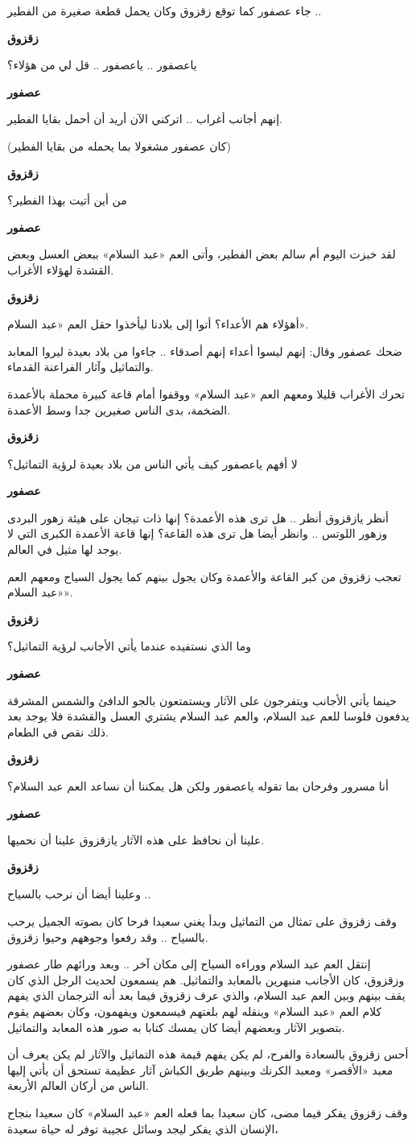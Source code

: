 \documentclass[12pt]{article}
\newlength{\SpeakerGutter}
\newlength{\DialogueGap}
\newlength{\StoryBodyWidth}
\newcommand{\Narration}[1]{%
  \par
  \noindent
  \begin{minipage}[t]{\StoryBodyWidth}
    \RaggedLeft
    #1
  \end{minipage}
  \par
}
\newcommand{\DialogueLine}[2]{%
  \par\addvspace{0.75\baselineskip}
  \noindent
  \begin{minipage}[t]{\SpeakerGutter}
    \RaggedLeft
    \bfseries #1
  \end{minipage}%
  \hspace{\DialogueGap}%
  \begin{minipage}[t]{\StoryBodyWidth}
    \RaggedLeft
    #2
  \end{minipage}%
  \par
}
\newcommand{\TextOnlyPage}[1]{%
  \clearpage
  \thispagestyle{empty}
  \vspace*{2mm}
  #1
  \clearpage
}
\begin{document}
\TextOnlyPage{%
  \Narration{جاء عصفور كما توقع زقزوق وكان يحمل قطعة صغيرة من الفطير ..}
  \DialogueLine{زقزوق}{ياعصفور .. ياعصفور .. قل لي من هؤلاء؟}
  \DialogueLine{عصفور}{إنهم أجانب أغراب .. اتركني الآن أريد أن أحمل بقايا الفطير.}
  \Narration{(كان عصفور مشغولا بما يحمله من بقايا الفطير)}
  \DialogueLine{زقزوق}{من أين أتيت بهذا الفطير؟}
  \DialogueLine{عصفور}{لقد خبزت اليوم أم سالم بعض الفطير، وأتى العم «عبد السلام» ببعض العسل وبعض القشدة لهؤلاء الأغراب.}
  \DialogueLine{زقزوق}{أهؤلاء هم الأعداء؟ أتوا إلى بلادنا ليأخذوا حقل العم «عبد السلام».}
  \Narration{ضحك عصفور وقال: إنهم ليسوا أعداء إنهم أصدقاء .. جاءوا من بلاد بعيدة ليروا المعابد والتماثيل وآثار الفراعنة القدماء.}
  \Narration{تحرك الأغراب قليلا ومعهم العم «عبد السلام» ووقفوا أمام قاعة كبيرة محملة بالأعمدة الضخمة، بدى الناس صغيرين جدا وسط الأعمدة.}
  \DialogueLine{زقزوق}{لا أفهم ياعصفور كيف يأتي الناس من بلاد بعيدة لرؤية التماثيل؟}
  \DialogueLine{عصفور}{أنظر يازقزوق أنظر .. هل ترى هذه الأعمدة؟ إنها ذات تيجان على هيئة زهور البردى وزهور اللوتس .. وانظر أيضا هل ترى هذه القاعة؟ إنها قاعة الأعمدة الكبرى التي لا يوجد لها مثيل في العالم.}
  \Narration{تعجب زقزوق من كبر القاعة والأعمدة وكان يجول بينهم كما يجول السياح ومعهم العم «عبد السلام».}
  \DialogueLine{زقزوق}{وما الذي نستفيده عندما يأتي الأجانب لرؤية التماثيل؟}
}

\TextOnlyPage{%
  \DialogueLine{عصفور}{حينما يأتي الأجانب ويتفرجون على الآثار ويستمتعون بالجو الدافئ والشمس المشرقة يدفعون فلوسا للعم عبد السلام، والعم عبد السلام يشتري العسل والقشدة فلا يوجد بعد ذلك نقص في الطعام.}
  \DialogueLine{زقزوق}{أنا مسرور وفرحان بما تقوله ياعصفور ولكن هل يمكننا أن نساعد العم عبد السلام؟}
  \DialogueLine{عصفور}{علينا أن نحافظ على هذه الآثار يازقزوق علينا أن نحميها.}
  \DialogueLine{زقزوق}{وعلينا أيضا أن نرحب بالسياح ..}
  \Narration{وقف زقزوق على تمثال من التماثيل وبدأ يغني سعيدا فرحا كان بصوته الجميل يرحب بالسياح .. وقد رفعوا وجوههم وحيوا زقزوق.}
  \Narration{إنتقل العم عبد السلام ووراءه السياح إلى مكان آخر .. وبعد ورائهم طار عصفور وزقزوق، كان الأجانب منبهرين بالمعابد والتماثيل. هم يسمعون لحديث الرجل الذي كان يقف بينهم وبين العم عبد السلام، والذي عرف زقزوق فيما بعد أنه الترجمان الذي يفهم كلام العم «عبد السلام» وينقله لهم بلغتهم فيسمعون ويفهمون، وكان بعضهم يقوم بتصوير الآثار وبعضهم أيضا كان يمسك كتابا به صور هذه المعابد والتماثيل.}
  \Narration{أحس زقزوق بالسعادة والفرح، لم يكن يفهم قيمة هذه التماثيل والآثار لم يكن يعرف أن معبد «الأقصر» ومعبد الكرنك وبينهم طريق الكباش آثار عظيمة تستحق أن يأتي إليها الناس من أركان العالم الأربعة.}
  \Narration{وقف زقزوق يفكر فيما مضى، كان سعيدا بما فعله العم «عبد السلام» كان سعيدا بنجاح الإنسان الذي يفكر ليجد وسائل عجيبة توفر له حياة سعيدة،}
}
\end{document}
